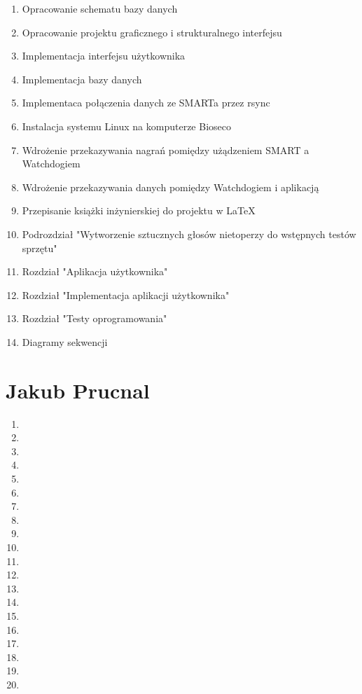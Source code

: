 \documentclass{sprz}
\begin{document}
\begin{enumerate}
  \item Opracowanie schematu bazy danych
  \item Opracowanie projektu graficznego i strukturalnego interfejsu
  \item Implementacja interfejsu użytkownika
  \item Implementacja bazy danych
  \item Implementaca połączenia danych ze SMARTa przez rsync
  \item Instalacja systemu Linux na komputerze Bioseco
  \item Wdrożenie przekazywania nagrań pomiędzy użądzeniem SMART a Watchdogiem
  \item Wdrożenie przekazywania danych pomiędzy Watchdogiem i aplikacją
  \item Przepisanie książki inżynierskiej do projektu w LaTeX
  \item Podrozdział "Wytworzenie sztucznych głosów nietoperzy do wstępnych testów sprzętu"
  \item Rozdział "Aplikacja użytkownika"
  \item Rozdział "Implementacja aplikacji użytkownika"
  \item Rozdział "Testy oprogramowania"
  \item Diagramy sekwencji
\end{enumerate}

\section{Jakub Prucnal}
\begin{enumerate}
  \item
  \item
  \item
  \item
  \item
  \item
  \item
  \item
  \item
  \item
  \item
  \item
  \item
  \item
  \item
  \item
  \item
  \item
  \item
  \item
\end{enumerate}
\end{document}
